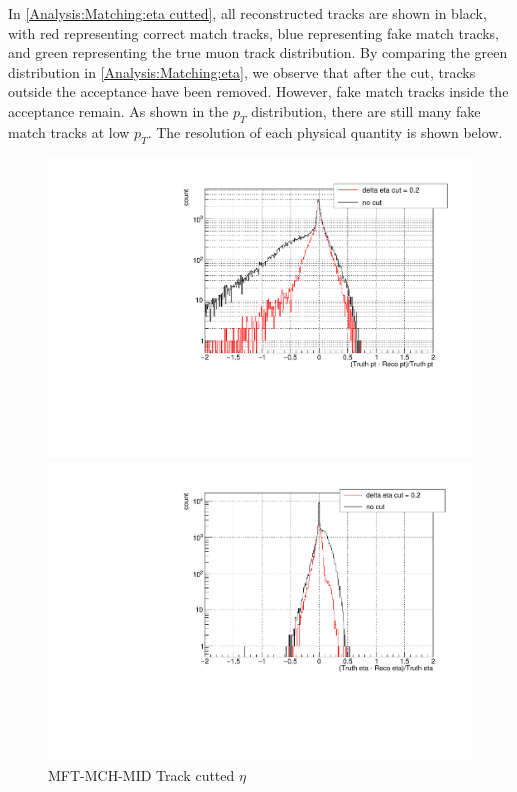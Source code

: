                In \ref{Analysis:Matching:eta cutted}, all reconstructed tracks are shown in black, with red representing correct match tracks, blue representing fake match tracks, and green representing the true muon track distribution. By comparing the green distribution in \ref{Analysis:Matching:eta}, we observe that after the cut, tracks outside the acceptance have been removed. However, fake match tracks inside the acceptance remain. As shown in the $p_T$ distribution, there are still many fake match tracks at low $p_T$.
                The resolution of each physical quantity is shown below.
                \begin{figure}[htbp]
                    \centering
                    \begin{minipage}{0.3\textwidth} %
                        \centering
                        \includegraphics[width=\textwidth]{fig/3_3_pt_resolution.pdf} %
                        \caption{MFT-MCH-MID Track cutted $\eta$}
                        \label{Analysis:Matching:pt resolution}
                    \end{minipage}
                    \begin{minipage}{0.3\textwidth}
                        \centering
                        \includegraphics[width=\textwidth]{fig/3_3_eta_resolution.pdf} %

\end{minipage}
\end{figure}
